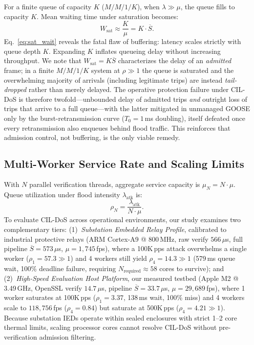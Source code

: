 \documentclass[journal]{IEEEtran}
\begin{document}
For a finite queue of capacity $K$ ($M/M/1/K$), when $\lambda \gg \mu$, the queue fills to capacity $K$. Mean waiting time under saturation becomes:
\begin{equation}
W_{\text{sat}} \approx \frac{K}{\mu} = K \cdot \overline{S}.
\label{eq:sat_wait}
\end{equation}
Eq.~\eqref{eq:sat_wait} reveals the fatal flaw of buffering: latency scales strictly with queue depth $K$. Expanding $K$ inflates queueing delay without increasing throughput. We note that $W_{\text{sat}} = K\overline{S}$ characterizes the delay of an \emph{admitted} frame; in a finite $M/M/1/K$ system at $\rho \gg 1$ the queue is saturated and the overwhelming majority of arrivals (including legitimate trips) are instead \emph{tail-dropped} rather than merely delayed. The operative protection failure under CIL-DoS is therefore twofold---unbounded delay of admitted trips \emph{and} outright loss of trips that arrive to a full queue---with the latter mitigated in unmanaged GOOSE only by the burst-retransmission curve ($T_0=1$\,ms doubling), itself defeated once every retransmission also enqueues behind flood traffic. This reinforces that admission control, not buffering, is the only viable remedy.

\subsection{Multi-Worker Service Rate and Scaling Limits}
With $N$ parallel verification threads, aggregate service capacity is $\mu_N = N \cdot \mu$. Queue utilization under flood intensity $\lambda_{\text{atk}}$ is:
\begin{equation}
\rho_N = \frac{\lambda_{\text{atk}}}{N \cdot \mu}.
\end{equation}
To evaluate CIL-DoS across operational environments, our study examines two complementary tiers: (1)~\emph{Substation Embedded Relay Profile}, calibrated to industrial protective relays (ARM Cortex-A9 @ 800\,MHz, raw verify $566\,\mu$s, full pipeline $\overline{S} = 573\,\mu$s, $\mu = 1{,}745$\,fps), where a 100K\,pps attack overwhelms a single worker ($\rho_1 = 57.3 \gg 1$) and 4 workers still yield $\rho_4 = 14.3 \gg 1$ (579\,ms queue wait, 100\% deadline failure, requiring $N_{\text{required}} \approx 58$ cores to survive); and (2)~\emph{High-Speed Evaluation Host Platform}, our measured testbed (Apple M2 @ 3.49\,GHz, OpenSSL verify $14.7\,\mu$s, pipeline $\overline{S} = 33.7\,\mu$s, $\mu = 29{,}689$\,fps), where 1 worker saturates at 100K\,pps ($\rho_1 = 3.37$, 138\,ms wait, 100\% miss) and 4 workers scale to $118{,}756$\,fps ($\rho_4 = 0.84$) but saturate at 500K\,pps ($\rho_4 = 4.21 \gg 1$). Because substation IEDs operate within sealed enclosures with strict 1--2 core thermal limits, scaling processor cores cannot resolve CIL-DoS without pre-verification admission filtering.
\end{document}
